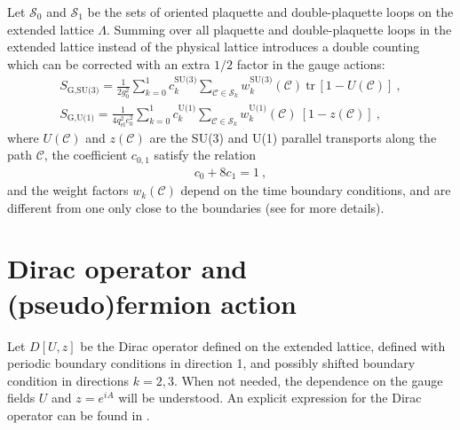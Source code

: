 \documentclass[11pt,fleqn]{article}
\newcommand{\tr}{\mathrm{tr}\,}
\begin{document}
Let $\mathcal{S}_0$ and $\mathcal{S}_1$ be the sets of oriented plaquette and double-plaquette loops on the extended lattice $\Lambda$. Summing over all plaquette and double-plaquette loops in the extended lattice instead of the physical lattice introduces a double counting which can be corrected with an extra $1/2$ factor in the gauge actions:
\begin{gather}
   S_{\text{G,SU(3)}} = \frac{1}{2g_0^2} \sum_{k=0}^1 c^\text{SU(3)}_k \sum_{\mathcal{C} \in \mathcal{S}_k} w^\text{SU(3)}_k(\mathcal{C}) \ \tr [ 1 - U(\mathcal{C}) ] \ ,
   \label{eq:action:SU3} \\
   S_{\text{G,U(1)}} = \frac{1}{4 q_\text{el}^2 e_0^2} \sum_{k=0}^1 c^\text{U(1)}_k \sum_{\mathcal{C} \in \mathcal{S}_k} w^\text{U(1)}_k(\mathcal{C}) \ [ 1 - z(\mathcal{C}) ] \ ,
   \label{eq:action:U1}
\end{gather}
where $U(\mathcal{C})$ and $z(\mathcal{C})$ are the SU(3) and U(1) parallel transports along the path $\mathcal{C}$, the coefficient $c_{0,1}$ satisfy the relation
\begin{gather}
   c_0 + 8c_1 = 1 \ ,
\end{gather}
and the weight factors $w_k(\mathcal{C})$ depend on the time boundary conditions, and are different from one only close to the boundaries (see \cite{gauge_action} for more details).



\section{Dirac operator and (pseudo)fermion action}

Let $D[U,z]$ be the Dirac operator defined on the extended lattice, defined with periodic boundary conditions in direction 1, and possibly shifted boundary condition in directions $k=2,3$. When not needed, the dependence on the gauge fields $U$ and $z = e^{iA}$ will be understood. An explicit expression for the Dirac operator can be found in \cite{dirac}.
\end{document}
